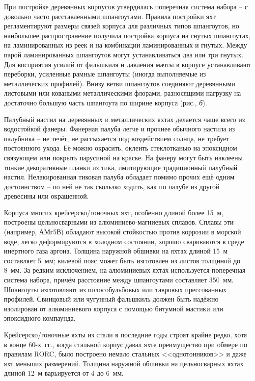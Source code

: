 При постройке деревянных корпусов утвердилась поперечная система
набора \--- с довольно часто расставленными шпангоутами. Правила
постройки яхт регламентируют размеры связей корпуса для различных
типов шпангоутов, но наибольшее распространение получила постройка
корпуса на гнутых шпангоутах, на ламинированных из реек и на
комбинации ламинированных и гнутых. Между парой ламинированных
шпангоутов могут устанавливаться два или три гнутых. Для восприятия
усилий от фальшкиля и давления мачты в корпусе устанавливают
переборки, усиленные рамные шпангоуты (иногда выполняемые из
металлических профилей). Внизу ветви шпангоутов соединяют деревянными
листовыми или коваными металлическими флорами, разносящими нагрузку на
достаточно большую часть шпангоута по ширине корпуса (рис.,
\textit{б}).

Палубный настил на деревянных и металлических яхтах делается чаще
всего из водостойкой фанеры. Фанерная палуба легче и прочнее обычного
настила из палубника \--- не течёт, не рассыхается под воздействием
солнца, не требует постоянного ухода. Её можно окрасить, оклеить
стеклотканью на эпоксидном связующем или покрыть парусиной на
краске. На фанеру могут быть наклеены тонкие декоративные планки из
тика, имитирующие традиционный палубный настил. Нелакированная тиковая
палуба обладает помимо прочих ещё одним достоинством \--- по ней не
так скользко ходить, как по палубе из другой древесины или окрашенной.
 
Корпуса многих крейсерско\-/гоночных яхт, особенно длиной более 15~м,
построены цельносварными из алюминиево-магниевых сплавов. Сплавы эти
(например, АМг5В) обладают высокой стойкостью против коррозии в
морской воде, легко деформируются в холодном состоянии, хорошо
свариваются в среде инертного газа аргона. Толщина наружной обшивки на
яхтах длиной 15~м составляет 5~мм; килевой пояс может
быть изготовлен из листов толщиной до 8~мм. За редким исключением, на
алюминиевых яхтах используется поперечная система набора, причём
расстояние между шпангоутами составляет 350~мм. Шпангоуты
изготовляют из полособульбовых или тавровых прессованных
профилей. Свинцовый или чугунный фальшкиль должен быть надёжно
изолирован от алюминиевого корпуса с помощью битумной мастики или
эпоксидного компаунда.

Крейсерско\-/гоночные яхты из стали в последние годы строят крайне
редко, хотя в конце 60-х~гг., когда стальной корпус давал яхте
преимущество при обмере по правилам RORC, было построено немало
стальных <<однотонников>> и даже яхт меньших размерений. Толщина
наружной обшивки на цельносварных яхтах длиной 12~м
варьируется от 4 до 6~мм.

